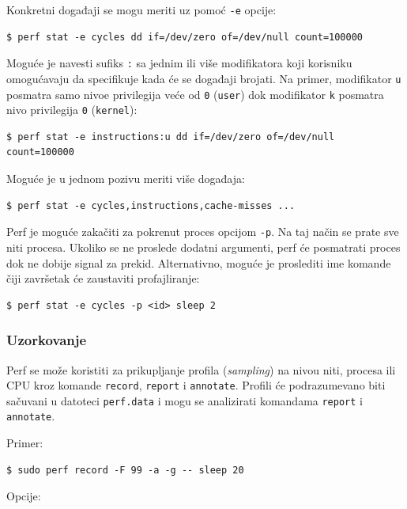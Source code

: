 Konkretni događaji se mogu meriti uz pomoć \texttt{-e} opcije:

\begin{verbatim}
$ perf stat -e cycles dd if=/dev/zero of=/dev/null count=100000
\end{verbatim}

Moguće je navesti sufiks \texttt{:} sa jednim ili više modifikatora koji korisniku omogućavaju da specifikuje kada će se događaji brojati. Na primer, modifikator \texttt{u} posmatra samo nivoe privilegija veće od \texttt{0} (\texttt{user}) dok modifikator \texttt{k} posmatra nivo privilegija \texttt{0} (\texttt{kernel}):

\begin{verbatim}
$ perf stat -e instructions:u dd if=/dev/zero of=/dev/null count=100000
\end{verbatim}

Moguće je u jednom pozivu meriti više događaja:

\begin{verbatim}
$ perf stat -e cycles,instructions,cache-misses ...
\end{verbatim}

Perf je moguće zakačiti za pokrenut proces opcijom \texttt{-p}. Na taj način se prate sve niti procesa. Ukoliko se ne proslede dodatni argumenti, perf će posmatrati proces dok ne dobije signal za prekid. Alternativno, moguće je proslediti ime komande čiji završetak će zaustaviti profajliranje:

\begin{verbatim}
$ perf stat -e cycles -p <id> sleep 2
\end{verbatim}

\subsubsection{Uzorkovanje}\label{uzorkovanje}

Perf se može koristiti za prikupljanje profila (\emph{sampling}) na nivou niti, procesa ili CPU kroz komande \texttt{record}, \texttt{report} i \texttt{annotate}. Profili će podrazumevano biti sačuvani u datoteci \texttt{perf.data} i mogu se analizirati komandama \texttt{report} i \texttt{annotate}.

Primer:

\begin{verbatim}
$ sudo perf record -F 99 -a -g -- sleep 20
\end{verbatim}

Opcije:


